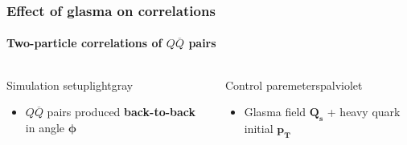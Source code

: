 \documentclass[aspectratio=169,11pt,usenames,dvipsnames]{beamer}
\begin{document}
\begin{frame}
    \frametitle{Effect of glasma on correlations}
    \framesubtitle{Two-particle correlations of $Q\overline{Q}$ pairs}
    \vspace{-15pt}
    \begin{center}
        \begin{columns}[onlytextwidth,t]
           \begin{center}
                \begin{custombox2}{\normalsize Simulation setup}{lightgray}
                    \small
                    \begin{varwidth}{\textwidth}
                    \begin{itemize}\itemsep0em 
                        \itemsep0em
                        \footnotesize
                        \item $Q\overline{Q}$ pairs produced {\bfseries back-to-back} in angle $\boldsymbol{\phi}$
                    \end{itemize}
                    \end{varwidth}
                \end{custombox2}
            \end{center}
            \begin{center}
                \begin{custombox2}{\normalsize Control paremeters}{palviolet}
                    \small
                    \begin{varwidth}{0.95\textwidth}
                    \begin{itemize}\itemsep0em 
                        \itemsep0em
                        \footnotesize
                        \item Glasma field {\color{palviolet}$\boldsymbol{Q_s}$} + heavy quark initial {\color{palviolet}$\boldsymbol{p_T}$}
                    \end{itemize}
                    \end{varwidth}
                \end{custombox2}
            \end{center}
        \end{columns}    


\end{center}
\end{frame}
\end{document}

